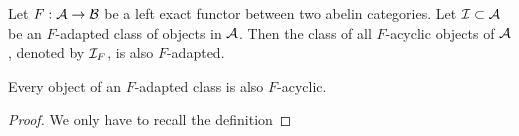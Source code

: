 

\begin{proposition}
    \label{F-acyclic is F-adapted}
    Let $F : \mathcal A \to \mathcal B$ be a left exact functor between two abelin categories. Let $\mathcal I \subset \mathcal A$ be an $F$-adapted class of objects in $\mathcal A$. Then the class of all $F$-acyclic objects of $\mathcal A$, denoted by $\mathcal I_F$, is also $F$-adapted. 
\end{proposition}

\begin{lemma}
    \label{F-adapted is F-acyclic}
    Every object of an $F$-adapted class is also $F$-acyclic.
\end{lemma}

\begin{proof}
    We only have to recall the definition 
\end{proof}

